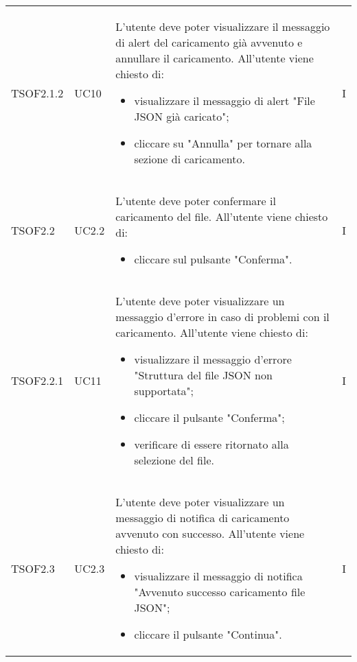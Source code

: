 \begin{longtable}{C{2.5cm} C{2.5cm} L{8cm} C{2cm}}
TSOF2.1.2 & UC10 &
L'utente deve poter visualizzare il messaggio di alert del caricamento già avvenuto e annullare il caricamento. \newline All'utente viene chiesto di:
\begin{itemize}
	\item visualizzare il messaggio di alert "File JSON già caricato";
	\item cliccare su "Annulla" per tornare alla sezione di caricamento.
\end{itemize} & I	\\

TSOF2.2 & UC2.2 &
L'utente deve poter confermare il caricamento del file. \newline All'utente viene chiesto di:
\begin{itemize}
	\item cliccare sul pulsante "Conferma".
\end{itemize} & I	\\


TSOF2.2.1 & UC11 &
L'utente deve poter visualizzare un messaggio d'errore in caso di problemi con il caricamento. \newline All'utente viene chiesto di:
\begin{itemize}
	\item visualizzare il messaggio d'errore "Struttura del file JSON non supportata";
	\item cliccare il pulsante "Conferma";
	\item verificare di essere ritornato alla selezione del file.
\end{itemize} & I	\\

TSOF2.3 & UC2.3 &
L'utente deve poter visualizzare un messaggio di notifica di caricamento avvenuto con successo. \newline All'utente viene chiesto di:
\begin{itemize}
	\item visualizzare il messaggio di notifica "Avvenuto successo caricamento file JSON";
	\item cliccare il pulsante "Continua".
\end{itemize} & I	\\


\end{longtable}
